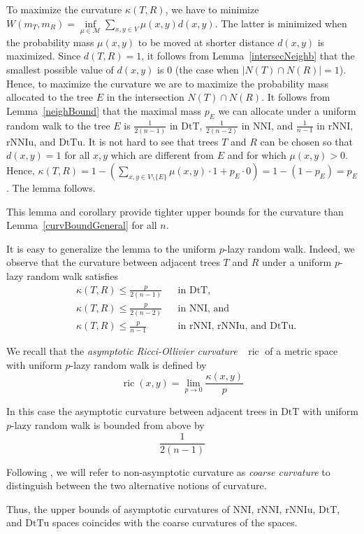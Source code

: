 \documentclass{amsart}
\theoremstyle{definition}
\newcommand{\nni}{\mathrm{NNI}}
\newcommand{\rnni}{\mathrm{rNNI}}
\newcommand{\rnniu}{\mathrm{rNNIu}}
\newcommand{\dtt}{\mathrm{DtT}}
\newcommand{\dttu}{\mathrm{DtTu}}
\newcommand{\ric}{\operatorname{ric}}
\newcommand{\M}{\mathcal{M}}
\begin{document}
{\proof
To maximize the curvature $\kappa(T,R)$, we have to minimize $W(m_T,m_R) = \inf\limits_{\mu\in\M} \sum\limits_{x,y\in V}\mu(x,y) d(x,y)$.
The latter is minimized when the probability mass $\mu(x,y)$ to be moved at shorter distance $d(x,y)$ is maximized.
Since $d(T,R) = 1$, it follows from Lemma~\ref{intersecNeighb} that the smallest possible value of $d(x,y)$ is $0$ (the case when $|N(T) \cap N(R)| = 1$).
Hence, to maximize the curvature we are to maximize the probability mass allocated to the tree $E$ in the intersection $N(T) \cap N(R)$.
It follows from Lemma~\ref{neighBound} that the maximal mass $p_E$ we can allocate under a uniform random walk to the tree $E$ is $\frac{1}{2(n-1)}$ in $\dtt$, $\frac{1}{2(n-2)}$ in $\nni$, and $\frac{1}{n-1}$ in $\rnni$, $\rnniu$, and $\dttu$.
It is not hard to see that trees $T$ and $R$ can be chosen so that $d(x,y) = 1$ for all $x,y$ which are different from $E$ and for which $\mu(x,y) > 0$.
Hence, $\kappa(T, R) = 1 - \left(\sum\limits_{x,y\in V\setminus\{E\}}\mu(x,y)\cdot 1 + p_E \cdot 0\right) = 1 - (1-p_E) = p_E$.
The lemma follows.
\endproof

This lemma and corollary provide tighter upper bounds for the curvature than Lemma~\ref{curvBoundGeneral} for all $n$.

It is easy to generalize the lemma to the uniform $p$-lazy random walk.
Indeed, we observe that the curvature between adjacent trees $T$ and $R$ under a uniform $p$-lazy random walk satisfies
\begin{align*}
& \kappa(T,R) \leq \frac{p}{2(n-1)}	&& \mbox{in $\dtt$,}\\
& \kappa(T,R) \leq \frac{p}{2(n-2)}	&& \mbox{in $\nni$, and}\\
& \kappa(T,R) \leq \frac{p}{n-1}	&& \mbox{in $\rnni$, $\rnniu$, and $\dttu$.}
\end{align*}

We recall that the \emph{asymptotic Ricci-Ollivier curvature}~\autocite{Loisel2014-gu} $\ric$ of a metric space with uniform $p$-lazy random walk is defined by
\[
\ric(x,y) = \lim_{p\to0} \frac{\kappa(x,y)}{p}
\]

In this case the asymptotic curvature between adjacent trees in $\dtt$ with uniform $p$-lazy random walk is bounded from above by
\[
\frac{1}{2(n-1)}
\]

Following \textcite{Loisel2014-gu}, we will refer to non-asymptotic curvature as \emph{coarse curvature} to distinguish between the two alternative notions of curvature.


Thus, the upper bounds of asymptotic curvatures of $\nni$, $\rnni$, $\rnniu$, $\dtt$, and $\dttu$ spaces coincides with the coarse curvatures of the spaces.

}
\end{document}
